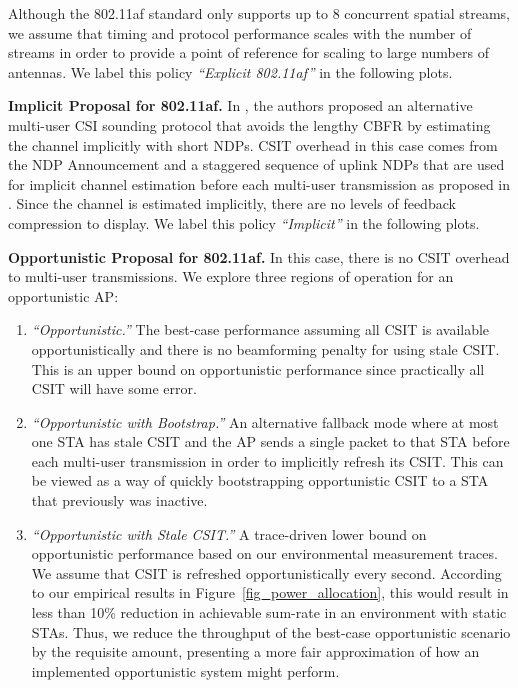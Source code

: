  Although the 802.11af standard only supports up to 8 concurrent spatial streams, we assume that timing and protocol performance scales with the number of streams in order to provide a point of reference for scaling to large numbers of antennas.
We label this policy \textit{``Explicit 802.11af''} in the following plots.


\textbf{Implicit Proposal for 802.11af.} 
	In \cite{lou2013comparison}, the authors proposed an alternative  multi-user \ac{CSI} sounding protocol that avoids the lengthy \ac{CBFR} by estimating the channel implicitly with short \acp{NDP}.
	\ac{CSIT} overhead in this case comes from the \ac{NDP} Announcement and a staggered sequence of uplink \acp{NDP} that are used for implicit channel estimation before each multi-user transmission as proposed in \cite{lou2013comparison}.
	Since the channel is estimated implicitly, there are no levels of feedback compression to display.
	We label this policy \textit{``Implicit''} in the following plots.

\textbf{Opportunistic Proposal for 802.11af.}
	In this case, there is no \ac{CSIT} overhead to multi-user transmissions.
	We explore three regions of operation for an opportunistic \ac{AP}:
\begin{enumerate}
\item \textit{``Opportunistic.''} The best-case performance assuming all \ac{CSIT} is available opportunistically and there is no beamforming penalty for using stale \ac{CSIT}. This is an upper bound on opportunistic performance since practically all \ac{CSIT} will have some error.

\item \textit{``Opportunistic with Bootstrap.''} An alternative fallback mode where at most one \ac{STA} has stale \ac{CSIT} and the \ac{AP} sends a single
packet to that \ac{STA} before each multi-user transmission in order to implicitly refresh its \ac{CSIT}.
This can be viewed as a way of quickly bootstrapping opportunistic \ac{CSIT} to a \ac{STA} that previously was inactive.

\item \textit{``Opportunistic with Stale CSIT.''} A trace-driven lower bound on opportunistic performance based on our environmental measurement traces.
We assume that \ac{CSIT} is refreshed opportunistically every second.
According to our empirical results in Figure~\ref{fig_power_allocation}, this would result in less than 10\% reduction in achievable sum-rate in an environment with static \acp{STA}.
Thus, we reduce the throughput of the best-case opportunistic scenario by the requisite amount, presenting a more fair approximation of how an implemented opportunistic system might perform.
\end{enumerate}

